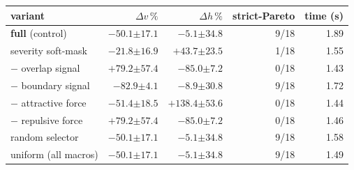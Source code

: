 \begin{tabular}{lrrrr}
\toprule
variant & $\Delta v\,\%$ & $\Delta h\,\%$ & strict-Pareto & time (s) \\
\midrule
\textbf{full} (control) & $-50.1{\scriptscriptstyle\pm17.1}$ & $-5.1{\scriptscriptstyle\pm34.8}$ & 9/18 & 1.89 \\
severity soft-mask & $-21.8{\scriptscriptstyle\pm16.9}$ & $+43.7{\scriptscriptstyle\pm23.5}$ & 1/18 & 1.55 \\
$-$ overlap signal & $+79.2{\scriptscriptstyle\pm57.4}$ & $-85.0{\scriptscriptstyle\pm7.2}$ & 0/18 & 1.43 \\
$-$ boundary signal & $-82.9{\scriptscriptstyle\pm4.1}$ & $-8.9{\scriptscriptstyle\pm30.8}$ & 9/18 & 1.72 \\
$-$ attractive force & $-51.4{\scriptscriptstyle\pm18.5}$ & $+138.4{\scriptscriptstyle\pm53.6}$ & 0/18 & 1.44 \\
$-$ repulsive force & $+79.2{\scriptscriptstyle\pm57.4}$ & $-85.0{\scriptscriptstyle\pm7.2}$ & 0/18 & 1.46 \\
random selector & $-50.1{\scriptscriptstyle\pm17.1}$ & $-5.1{\scriptscriptstyle\pm34.8}$ & 9/18 & 1.58 \\
uniform (all macros) & $-50.1{\scriptscriptstyle\pm17.1}$ & $-5.1{\scriptscriptstyle\pm34.8}$ & 9/18 & 1.49 \\
\bottomrule
\end{tabular}

